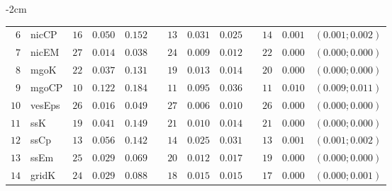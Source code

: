 \begin{table*}[!htbp]
\begin{adjustwidth*}{}{-2cm}
\begin{tabular}{@{}rlrrrrrrrrrcc@{}}
\footnotesize{$6 $} & \footnotesize{nicCP    } & \footnotesize{$16$} & \footnotesize{$0.050$} & \footnotesize{$0.152$} && \footnotesize{$13$} & \footnotesize{$0.031$} & \footnotesize{$0.025$} && \footnotesize{$14$} & \footnotesize{$0.001$} & \footnotesize{$(0.001;0.002)$} \\
\footnotesize{$7 $} & \footnotesize{nicEM    } & \footnotesize{$27$} & \footnotesize{$0.014$} & \footnotesize{$0.038$} && \footnotesize{$24$} & \footnotesize{$0.009$} & \footnotesize{$0.012$} && \footnotesize{$22$} & \footnotesize{$0.000$} & \footnotesize{$(0.000;0.000)$} \\
\footnotesize{$8 $} & \footnotesize{mgoK     } & \footnotesize{$22$} & \footnotesize{$0.037$} & \footnotesize{$0.131$} && \footnotesize{$19$} & \footnotesize{$0.013$} & \footnotesize{$0.014$} && \footnotesize{$20$} & \footnotesize{$0.000$} & \footnotesize{$(0.000;0.000)$} \\
\footnotesize{$9 $} & \footnotesize{mgoCP    } & \footnotesize{$10$} & \footnotesize{$0.122$} & \footnotesize{$0.184$} && \footnotesize{$11$} & \footnotesize{$0.095$} & \footnotesize{$0.036$} && \footnotesize{$11$} & \footnotesize{$0.010$} & \footnotesize{$(0.009;0.011)$} \\
\footnotesize{$10$} & \footnotesize{vesEps   } & \footnotesize{$26$} & \footnotesize{$0.016$} & \footnotesize{$0.049$} && \footnotesize{$27$} & \footnotesize{$0.006$} & \footnotesize{$0.010$} && \footnotesize{$26$} & \footnotesize{$0.000$} & \footnotesize{$(0.000;0.000)$} \\
\footnotesize{$11$} & \footnotesize{ssK      } & \footnotesize{$19$} & \footnotesize{$0.041$} & \footnotesize{$0.149$} && \footnotesize{$21$} & \footnotesize{$0.010$} & \footnotesize{$0.014$} && \footnotesize{$21$} & \footnotesize{$0.000$} & \footnotesize{$(0.000;0.000)$} \\
\footnotesize{$12$} & \footnotesize{ssCp     } & \footnotesize{$13$} & \footnotesize{$0.056$} & \footnotesize{$0.142$} && \footnotesize{$14$} & \footnotesize{$0.025$} & \footnotesize{$0.031$} && \footnotesize{$13$} & \footnotesize{$0.001$} & \footnotesize{$(0.001;0.002)$} \\
\footnotesize{$13$} & \footnotesize{ssEm     } & \footnotesize{$25$} & \footnotesize{$0.029$} & \footnotesize{$0.069$} && \footnotesize{$20$} & \footnotesize{$0.012$} & \footnotesize{$0.017$} && \footnotesize{$19$} & \footnotesize{$0.000$} & \footnotesize{$(0.000;0.000)$} \\
\footnotesize{$14$} & \footnotesize{gridK    } & \footnotesize{$24$} & \footnotesize{$0.029$} & \footnotesize{$0.088$} && \footnotesize{$18$} & \footnotesize{$0.015$} & \footnotesize{$0.015$} && \footnotesize{$17$} & \footnotesize{$0.000$} & \footnotesize{$(0.000;0.001)$} \\

\end{tabular}
\end{adjustwidth*}
\end{table*}
